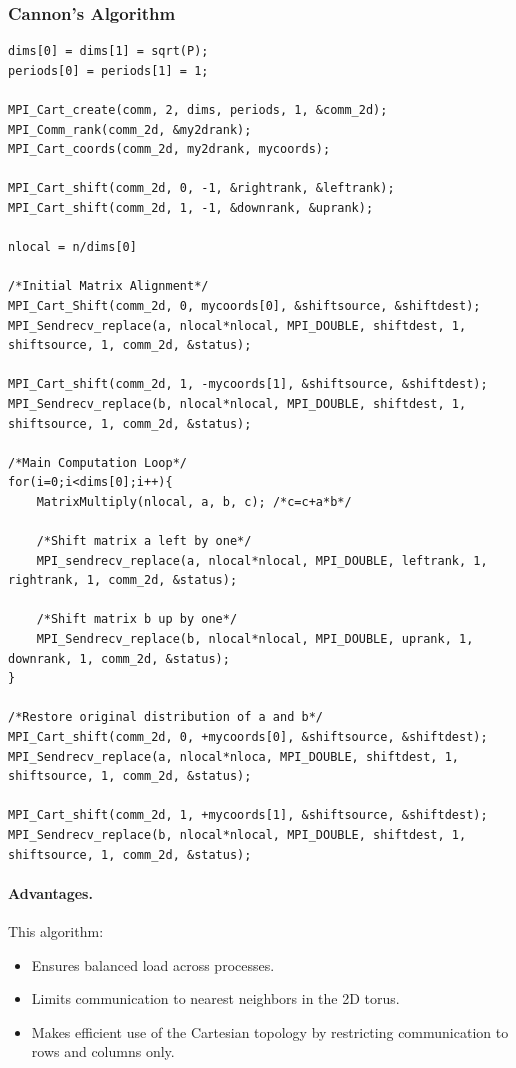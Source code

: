 \documentclass[12pt]{book}
\begin{document}
\subsubsection{Cannon's Algorithm}
\begin{lstlisting}[style=cppstyle]
dims[0] = dims[1] = sqrt(P);
periods[0] = periods[1] = 1;

MPI_Cart_create(comm, 2, dims, periods, 1, &comm_2d);
MPI_Comm_rank(comm_2d, &my2drank);
MPI_Cart_coords(comm_2d, my2drank, mycoords);

MPI_Cart_shift(comm_2d, 0, -1, &rightrank, &leftrank);
MPI_Cart_shift(comm_2d, 1, -1, &downrank, &uprank);

nlocal = n/dims[0]

/*Initial Matrix Alignment*/
MPI_Cart_Shift(comm_2d, 0, mycoords[0], &shiftsource, &shiftdest);
MPI_Sendrecv_replace(a, nlocal*nlocal, MPI_DOUBLE, shiftdest, 1, shiftsource, 1, comm_2d, &status);

MPI_Cart_shift(comm_2d, 1, -mycoords[1], &shiftsource, &shiftdest);
MPI_Sendrecv_replace(b, nlocal*nlocal, MPI_DOUBLE, shiftdest, 1, shiftsource, 1, comm_2d, &status);

/*Main Computation Loop*/
for(i=0;i<dims[0];i++){
    MatrixMultiply(nlocal, a, b, c); /*c=c+a*b*/

    /*Shift matrix a left by one*/
    MPI_sendrecv_replace(a, nlocal*nlocal, MPI_DOUBLE, leftrank, 1, rightrank, 1, comm_2d, &status);

    /*Shift matrix b up by one*/
    MPI_Sendrecv_replace(b, nlocal*nlocal, MPI_DOUBLE, uprank, 1, downrank, 1, comm_2d, &status);
}

/*Restore original distribution of a and b*/
MPI_Cart_shift(comm_2d, 0, +mycoords[0], &shiftsource, &shiftdest);
MPI_Sendrecv_replace(a, nlocal*nloca, MPI_DOUBLE, shiftdest, 1, shiftsource, 1, comm_2d, &status);

MPI_Cart_shift(comm_2d, 1, +mycoords[1], &shiftsource, &shiftdest);
MPI_Sendrecv_replace(b, nlocal*nlocal, MPI_DOUBLE, shiftdest, 1, shiftsource, 1, comm_2d, &status);
\end{lstlisting}
\paragraph{Advantages.}  
This algorithm:
\begin{itemize}
    \item Ensures balanced load across processes.
    \item Limits communication to nearest neighbors in the 2D torus.
    \item Makes efficient use of the Cartesian topology by restricting communication to rows and columns only.
\end{itemize}
\end{document}
